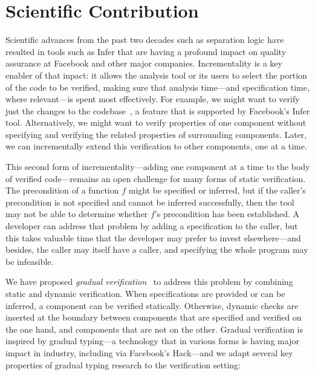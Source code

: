 \documentclass[10pt,twocolumn]{article}
\begin{document}
\begin{sloppypar}


\section{Scientific Contribution}

Scientific advances from the past two decades such as separation logic have resulted in tools such as Infer that are having a profound impact on quality assurance at Facebook and other major companies.  Incrementality is a key enabler of that inpact: it allows the analysis tool or its users to select the portion of the code to be verified, making sure that analysis time---and specification time, where relevant---is spent most effectively.  For example, we might want to verify just the changes to the codebase~\cite{StartupsScaleups}, a feature that is supported by Facebook's Infer tool.  Alternatively, we might want to verify properties of one component without specifying and verifying the related properties of surrounding components.  Later, we can incrementally extend this verification to other components, one at a time.

This second form of incrementality---adding one component at a time to the body of verified code---remains an open challenge for many forms of static verification.  The precondition of a function $f$ might be specified or inferred, but if the caller's precondition is not specified and cannot be inferred successfully, then the tool may not be able to determine whether $f$'s precondition has been established.  A developer can address that problem by adding a specification to the caller, but this takes valuable time that the developer may prefer to invest elsewhere---and besides, the caller may itself have a caller, and specifying the whole program may be infeasible.

We have proposed \textit{gradual verification}~\cite{GradualVerification} to address this problem by combining static and dynamic verification.  When specifications are provided or can be inferred, a component can be verified statically.  Otherwise, dynamic checks are inserted at the boundary between components that are specified and verified on the one hand, and components that are not on the other.  Gradual verification is inspired by gradual typing---a technology that in various forms is having major impact in industry, including via Facebook's Hack---and we adapt several key properties of gradual typing research to the verification setting:


\end{sloppypar}
\end{document}
